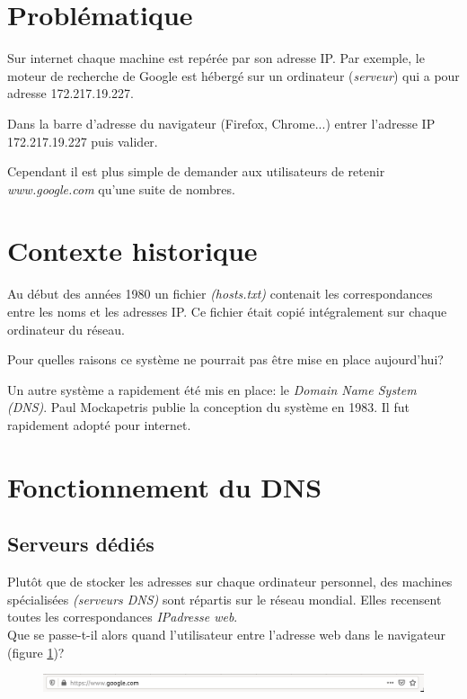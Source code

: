 \documentclass[a4paper,11pt]{article}
\begin{document}
\begin{Form}
\section{Problématique}
Sur internet chaque machine est repérée par son adresse IP. Par exemple, le moteur de recherche de Google est hébergé sur un ordinateur (\emph{serveur}) qui a pour adresse 172.217.19.227.
\begin{activite}
Dans la barre d'adresse du navigateur (Firefox, Chrome...) entrer l'adresse IP 172.217.19.227 puis valider.
\end{activite}
Cependant il est plus simple de demander aux utilisateurs de retenir \emph{www.google.com} qu'une suite de nombres.
\begin{center}
\end{center}
\section{Contexte historique}
Au début des années 1980 un fichier \emph{(hosts.txt)} contenait les correspondances entre les noms et les adresses IP. Ce fichier était copié intégralement sur chaque ordinateur du réseau.
\begin{activite}
Pour quelles raisons ce système ne pourrait pas être mise en place aujourd'hui?
\end{activite}
Un autre système a rapidement été mis en place: le \emph{Domain Name System (DNS)}. Paul Mockapetris publie la conception du système en 1983. Il fut rapidement adopté pour internet.
\section{Fonctionnement du DNS}
\subsection{Serveurs dédiés}
Plutôt que de stocker les adresses sur chaque ordinateur personnel, des machines spécialisées \emph{(serveurs DNS)} sont répartis sur le réseau mondial. Elles recensent toutes les correspondances \emph{IP}\leftrightarrow\emph{adresse web}.\\
Que se passe-t-il alors quand l'utilisateur entre l'adresse web dans le navigateur (figure \ref{barre})?
\begin{figure}[!h]
\centering
\includegraphics[width=15cm]{ressources/barre.png}
\label{barre}
\end{figure}


\end{Form}
\end{document}
